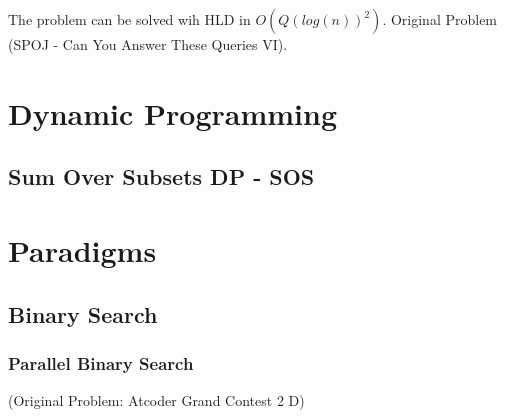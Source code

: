\documentclass{report}
\newcommand{\RomanNumeralCaps}[1]
    {\MakeUppercase{\romannumeral #1}}
\begin{document}
        The problem can be solved wih HLD in $O(Q(log(n))^2)$. Original Problem (SPOJ - Can You Answer These Queries VI).
        
        
        
    \chapter{Dynamic Programming }
    \section{Sum Over Subsets DP - SOS}
    
    \chapter{Paradigms \RomanNumeralCaps{10}}
    \section{Binary Search}
    \subsection{Parallel Binary Search}
    (Original Problem: Atcoder Grand Contest 2 D)
     
\end{document}
